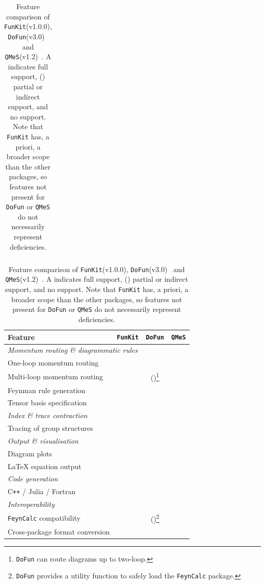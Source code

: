 \documentclass[preprint,10pt,sort&compress]{elsarticle}
\newcommand{\cmark}{\ding{51}}
\newcommand{\xmark}{\ding{55}}
\newcommand{\FunKit}{\texttt{FunKit}\xspace}
\newcommand{\QMeS}{\texttt{QMeS}\xspace}
\newcommand{\DoFun}{\texttt{DoFun}\xspace}
\begin{document}
\begin{table}[t]
\begin{minipage}{1\linewidth}
\begin{tabular}[t]{l c c c |}
		\end{tabular}%
		\begin{tabular}[t]{l c c c}
			\toprule
			\textbf{Feature} & \FunKit & \DoFun & \QMeS \\
			\midrule
			\multicolumn{4}{l}{\textit{Momentum routing \& diagrammatic rules}} \\
			\quad One-loop momentum routing             & \cmark  & \cmark  & \cmark \\
			\quad Multi-loop momentum routing           & \cmark  & (\cmark)\footnote{\DoFun can route diagrams up to two-loop.}  & \xmark \\
			\quad Feynman rule generation               & \cmark  & \cmark  & \xmark \\
			\quad Tensor basis specification            & \cmark  & \xmark  & \xmark \\
			\midrule
			\multicolumn{4}{l}{\textit{Index \& trace contraction}} \\
			\quad Tracing of group structures           & \cmark  & \xmark  & \xmark \\
			\midrule
			\multicolumn{4}{l}{\textit{Output \& visualisation}} \\
			\quad Diagram plots                         & \cmark  & \cmark  & \xmark \\
			\quad \LaTeX{} equation output              & \cmark  & \xmark  & \xmark \\
			\midrule
			\multicolumn{4}{l}{\textit{Code generation}} \\
			\quad C\texttt{++} / Julia / Fortran                 & \cmark  & \xmark  & \xmark \\
			\midrule
			\multicolumn{4}{l}{\textit{Interoperability}} \\
			\quad \texttt{FeynCalc} compatibility                & \xmark  & (\cmark)\footnote{\DoFun provides a utility function to safely load the \texttt{FeynCalc} package.} & \xmark \\
			\quad Cross-package format conversion       & \cmark  & \xmark  & \xmark \\
		\end{tabular}
	\end{minipage}
	
	\caption{Feature comparison of \FunKit (v1.0.0), \DoFun (v3.0)~\cite{Huber:2019dkb,Huber:2011qr} and \QMeS (v1.2)~\cite{Pawlowski:2021tkk}. A \cmark{} indicates full support, (\cmark) partial or indirect support, and \xmark{} no support.
		Note that \FunKit has, a priori, a broader scope than the other packages, so features not present for \DoFun or \QMeS do not necessarily represent deficiencies.}
	\label{tab:comparison}
\end{table}         
\end{document}
